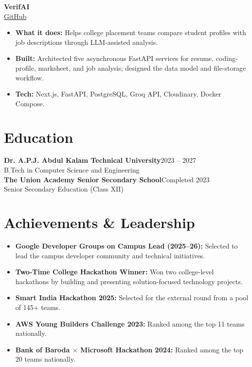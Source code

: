 \documentclass[11pt,a4paper]{article}
\newcommand{\projectlinks}[2]{%
  \small
  \href{#1}{GitHub}%
  \ifblank{#2}{}{\ $|$ \ \href{#2}{Live}}%
  \normalsize\\[-2pt]
}
\newcommand{\projectheading}[3]{%
  \Needspace{7\baselineskip}%
  \textbf{#1}\\[-1pt]
  \projectlinks{#2}{#3}%
}
\begin{document}
\vspace{5pt}
\projectheading
  {VerifAI}
  {https://github.com/ansh-logics/VerifAI}
  {}
\begin{itemize}
  \item \textbf{What it does:} Helps college placement teams compare student profiles with job descriptions through LLM-assisted analysis.
  \item \textbf{Built:} Architected five asynchronous FastAPI services for resume, coding-profile, marksheet, and job analysis; designed the data model and file-storage workflow.
  \item \textbf{Tech:} Next.js, FastAPI, PostgreSQL, Groq API, Cloudinary, Docker Compose.
\end{itemize}

\section*{Education}
\textbf{Dr. A.P.J. Abdul Kalam Technical University}\hfill 2023 -- 2027\\
B.Tech in Computer Science and Engineering\\[4pt]
\textbf{The Union Academy Senior Secondary School}\hfill Completed 2023\\
Senior Secondary Education (Class XII)

\section*{Achievements \& Leadership}
\begin{itemize}
  \item \textbf{Google Developer Groups on Campus Lead (2025--26):} Selected to lead the campus developer community and technical initiatives.
  \item \textbf{Two-Time College Hackathon Winner:} Won two college-level hackathons by building and presenting solution-focused technology projects.
  \item \textbf{Smart India Hackathon 2025:} Selected for the external round from a pool of 145+ teams.
  \item \textbf{AWS Young Builders Challenge 2023:} Ranked among the top 11 teams nationally.
  \item \textbf{Bank of Baroda $\times$ Microsoft Hackathon 2024:} Ranked among the top 20 teams nationally.
\end{itemize}
\end{document}
